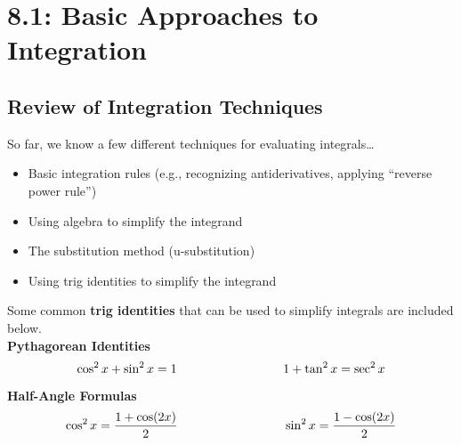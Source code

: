 \documentclass[12pt]{article}
\begin{document}
\section*{8.1: Basic Approaches to Integration}


\vspace{5mm}

\subsection*{Review of Integration Techniques}

So far, we know a few different techniques for evaluating integrals\dots
\begin{itemize}
	\item Basic integration rules (e.g., recognizing antiderivatives, applying ``reverse power rule'')
	\item Using algebra to simplify the integrand
	\item The substitution method (u-substitution)
	\item Using trig identities to simplify the integrand
\end{itemize}

Some common \textbf{trig identities} that can be used to simplify integrals are included below.\\

\textbf{Pythagorean Identities}
$$\cos^2x+\sin^2x=1\hspace{30mm}1+\tan^2x=\sec^2x$$

\textbf{Half-Angle Formulas}
$$\cos^2x=\frac{1+\cos(2x)}{2}\hspace{30mm}\sin^2x=\frac{1-\cos(2x)}{2}$$
\end{document}
